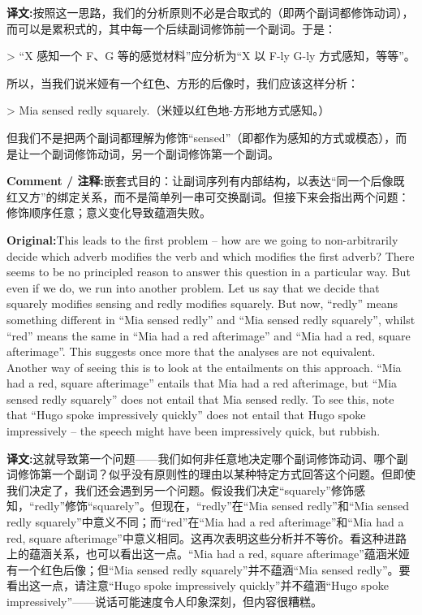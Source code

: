 \documentclass[11pt,a4paper]{article}
\newcommand{\eng}[1]{\begin{engbox}\noindent\textbf{Original:}\quad #1\end{engbox}}
\newcommand{\cn}[1]{\begin{cnbox}\noindent\textbf{译文:}\quad #1\end{cnbox}}
\newcommand{\cmt}[1]{\begin{commentbox}\noindent\textbf{Comment / 注释:}\quad #1\end{commentbox}}
\begin{document}
\cn{按照这一思路，我们的分析原则不必是合取式的（即两个副词都修饰动词），而可以是累积式的，其中每一个后续副词修饰前一个副词。于是：

> “X 感知一个 F、G 等的感觉材料”应分析为“X 以 F-ly G-ly 方式感知，等等”。

所以，当我们说米娅有一个红色、方形的后像时，我们应该这样分析：

> Mia sensed redly squarely.（米娅以红色地-方形地方式感知。）

但我们不是把两个副词都理解为修饰“sensed”（即都作为感知的方式或模态），而是让一个副词修饰动词，另一个副词修饰第一个副词。}

\cmt{嵌套式目的：让副词序列有内部结构，以表达“同一个后像既红又方”的绑定关系，而不是简单列一串可交换副词。但接下来会指出两个问题：修饰顺序任意；意义变化导致蕴涵失败。}

\eng{This leads to the first problem – how are we going to non-arbitrarily decide which adverb modifies the verb and which modifies the first adverb? There seems to be no principled reason to answer this question in a particular way. But even if we do, we run into another problem. Let us say that we decide that squarely modifies sensing and redly modifies squarely. But now, “redly” means something different in “Mia sensed redly” and “Mia sensed redly squarely”, whilst “red” means the same in “Mia had a red afterimage” and “Mia had a red, square afterimage”. This suggests once more that the analyses are not equivalent. Another way of seeing this is to look at the entailments on this approach. “Mia had a red, square afterimage” entails that Mia had a red afterimage, but “Mia sensed redly squarely” does not entail that Mia sensed redly. To see this, note that “Hugo spoke impressively quickly” does not entail that Hugo spoke impressively – the speech might have been impressively quick, but rubbish.}

\cn{这就导致第一个问题——我们如何非任意地决定哪个副词修饰动词、哪个副词修饰第一个副词？似乎没有原则性的理由以某种特定方式回答这个问题。但即使我们决定了，我们还会遇到另一个问题。假设我们决定“squarely”修饰感知，“redly”修饰“squarely”。但现在，“redly”在“Mia sensed redly”和“Mia sensed redly squarely”中意义不同；而“red”在“Mia had a red afterimage”和“Mia had a red, square afterimage”中意义相同。这再次表明这些分析并不等价。看这种进路上的蕴涵关系，也可以看出这一点。“Mia had a red, square afterimage”蕴涵米娅有一个红色后像；但“Mia sensed redly squarely”并不蕴涵“Mia sensed redly”。要看出这一点，请注意“Hugo spoke impressively quickly”并不蕴涵“Hugo spoke impressively”——说话可能速度令人印象深刻，但内容很糟糕。}
\end{document}

